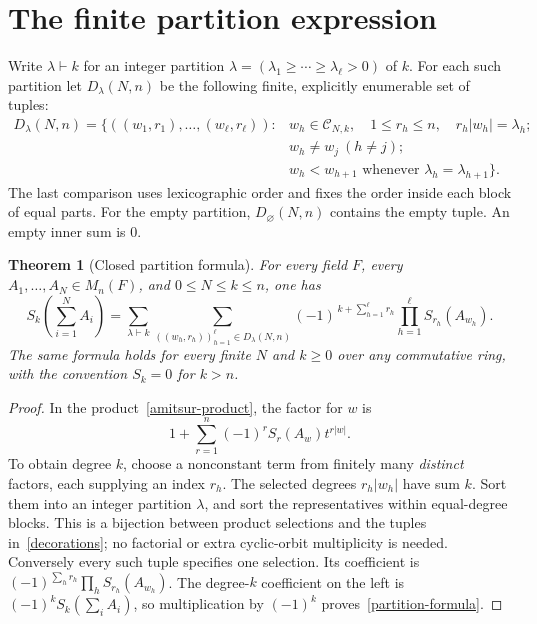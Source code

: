 \documentclass[11pt]{article}
\newtheorem{theorem}{Theorem}[section]
\begin{document}
\section{The finite partition expression}
Write $\lambda\vdash k$ for an integer partition
$\lambda=(\lambda_1\geq\cdots\geq\lambda_\ell>0)$ of $k$.
For each such partition let $D_\lambda(N,n)$ be the following finite,
explicitly enumerable set of tuples:
\begin{equation}\label{decorations}
 \begin{split}
 D_\lambda(N,n)=\bigl\{((w_1,r_1),\ldots,(w_\ell,r_\ell)): &
 w_h\in\mathcal C_{N,k},\quad 1\leq r_h\leq n,\quad
 r_h|w_h|=\lambda_h;\\
 &w_h\ne w_j\ (h\ne j);\\
 &w_h<w_{h+1}\text{ whenever }\lambda_h=\lambda_{h+1}\bigr\}.
 \end{split}
\end{equation}
The last comparison uses lexicographic order and fixes the order inside
each block of equal parts. For the empty partition, $D_\varnothing(N,n)$
contains the empty tuple. An empty inner sum is $0$.

\begin{theorem}[Closed partition formula]\label{main}
For every field $F$, every $A_1,\ldots,A_N\in M_n(F)$, and
$0\leq N\leq k\leq n$, one has
\begin{equation}\label{partition-formula}
 \boxed{\displaystyle
 S_k\left(\sum_{i=1}^N A_i\right)=
 \sum_{\lambda\vdash k}
 \sum_{((w_h,r_h))_{h=1}^{\ell}\in D_\lambda(N,n)}
       (-1)^{\,k+\sum_{h=1}^{\ell}r_h}
       \prod_{h=1}^{\ell}S_{r_h}(A_{w_h}).}
\end{equation}
The same formula holds for every finite $N$ and $k\geq0$ over any
commutative ring, with the convention $S_k=0$ for $k>n$.
\end{theorem}
\begin{proof}
In the product~\eqref{amitsur-product}, the factor for $w$ is
\[
 1+\sum_{r=1}^n(-1)^r S_r(A_w)t^{r|w|}.
\]
To obtain degree $k$, choose a nonconstant term from finitely many
\emph{distinct} factors, each supplying an index $r_h$. The selected
degrees $r_h|w_h|$ have sum $k$. Sort them into an integer partition
$\lambda$, and sort the representatives within equal-degree blocks.
This is a bijection between product selections and the tuples
in~\eqref{decorations}; no factorial or extra cyclic-orbit multiplicity
is needed. Conversely every such tuple specifies one selection.
Its coefficient is $(-1)^{\sum_h r_h}\prod_h S_{r_h}(A_{w_h})$.
The degree-$k$ coefficient on the left is $(-1)^k S_k(\sum_iA_i)$,
so multiplication by $(-1)^k$ proves~\eqref{partition-formula}.
\end{proof}
\end{document}

